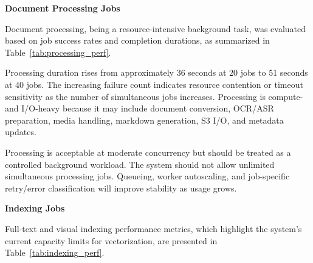 \textbf{Document Processing Jobs}

Document processing, being a resource-intensive background task, was evaluated based on job success rates and completion durations, as summarized in Table~\ref{tab:processing_perf}.

\begin{table}[H]
    \centering
    \caption{Document Processing Performance Matrix.}
    \label{tab:processing_perf}
\end{table}

Processing duration rises from approximately 36 seconds at 20 jobs to 51 seconds at 40 jobs. The increasing failure count indicates resource contention or timeout sensitivity as the number of simultaneous jobs increases. Processing is compute- and I/O-heavy because it may include document conversion, OCR/ASR preparation, media handling, markdown generation, S3 I/O, and metadata updates.

Processing is acceptable at moderate concurrency but should be treated as a controlled background workload. The system should not allow unlimited simultaneous processing jobs. Queueing, worker autoscaling, and job-specific retry/error classification will improve stability as usage grows.

\textbf{Indexing Jobs}

Full-text and visual indexing performance metrics, which highlight the system's current capacity limits for vectorization, are presented in Table~\ref{tab:indexing_perf}.

\begin{table}[H]
    \centering
    \caption{Indexing Performance Matrix.}
    \label{tab:indexing_perf}
\end{table}

